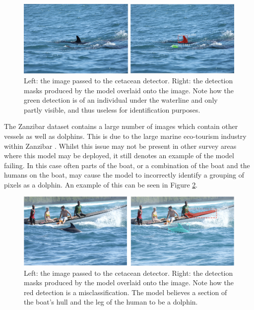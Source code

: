 \begin{figure}[h]
	\begin{center}
		\includegraphics[scale=0.6]{Chapter4/figs/model-fail-underwater.png}
	\end{center}
	\caption[Left: the image passed to the cetacean detector. Right: the detection masks produced by the model overlaid onto the image.]{Left: the image passed to the cetacean detector. Right: the detection masks produced by the model overlaid onto the image. Note how the green detection is of an individual under the waterline and only partly visible, and thus useless for identification purposes. }
	\label{fig:model-fail-underwater}
\end{figure}

The Zanzibar dataset contains a large number of images which contain other vessels as well as dolphins. This is due to the large marine eco-tourism industry within Zanzibar \cite{sharpe_indian_2019, berggren_sustainable_2007}. Whilst this issue may not be present in other survey areas where this model may be deployed, it still denotes an example of the model failing. In this case often parts of the boat, or a combination of the boat and the humans on the boat, may cause the model to incorrectly identify a grouping of pixels as a dolphin. An example of this can be seen in Figure \ref{fig:model-fail-boat}.
 
\begin{figure}[h]
	\begin{center}
		\includegraphics[scale=0.6]{Chapter4/figs/model-fail-boat.png}
	\end{center}
	\caption[Left: the image passed to the cetacean detector. Right: the detection masks produced by the model overlaid onto the image.]{Left: the image passed to the cetacean detector. Right: the detection masks produced by the model overlaid onto the image. Note how the red detection is a misclassification. The model believes a section of the boat's hull and the leg of the human to be a dolphin.}
	\label{fig:model-fail-boat}
\end{figure}

